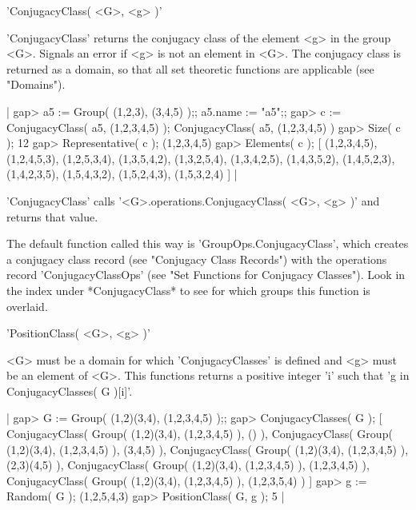 
'ConjugacyClass( <G>, <g> )'

'ConjugacyClass' returns the conjugacy class of the  element  <g> in  the
group  <G>.  Signals  an  error  if <g> is not an  element in  <G>.   The
conjugacy class  is returned as a  domain,  so  that  all  set  theoretic
functions are applicable (see "Domains").

|    gap> a5 := Group( (1,2,3), (3,4,5) );;  a5.name := "a5";;
    gap> c := ConjugacyClass( a5, (1,2,3,4,5) );
    ConjugacyClass( a5, (1,2,3,4,5) )
    gap> Size( c );
    12
    gap> Representative( c );
    (1,2,3,4,5)
    gap> Elements( c );
    [ (1,2,3,4,5), (1,2,4,5,3), (1,2,5,3,4), (1,3,5,4,2), (1,3,2,5,4), 
      (1,3,4,2,5), (1,4,3,5,2), (1,4,5,2,3), (1,4,2,3,5), (1,5,4,3,2), 
      (1,5,2,4,3), (1,5,3,2,4) ] |

'ConjugacyClass'  calls '<G>.operations.ConjugacyClass(  <G>, <g> )'  and
returns that value.

The default function called this  way is 'GroupOps.ConjugacyClass', which
creates a conjugacy class record (see "Conjugacy Class Records") with the
operations record 'ConjugacyClassOps' (see  "Set Functions  for Conjugacy
Classes").   Look  in  the index  under *ConjugacyClass* to see for which
groups this function is overlaid.


'PositionClass( <G>, <g> )'

<G> must be a domain for which 'ConjugacyClasses' is defined and <g> must
be an element of <G>. This functions returns  a positive integer 'i' such
that 'g in ConjugacyClasses( G )[i]'.


|    gap> G := Group( (1,2)(3,4), (1,2,3,4,5) );;
    gap> ConjugacyClasses( G );
    [ ConjugacyClass( Group( (1,2)(3,4), (1,2,3,4,5) ), () ),
      ConjugacyClass( Group( (1,2)(3,4), (1,2,3,4,5) ), (3,4,5) ),
      ConjugacyClass( Group( (1,2)(3,4), (1,2,3,4,5) ), (2,3)(4,5) ),
      ConjugacyClass( Group( (1,2)(3,4), (1,2,3,4,5) ), (1,2,3,4,5) ),
      ConjugacyClass( Group( (1,2)(3,4), (1,2,3,4,5) ), (1,2,3,5,4) ) ]
    gap>  g := Random( G );
    (1,2,5,4,3)
    gap> PositionClass( G, g );
    5 |



